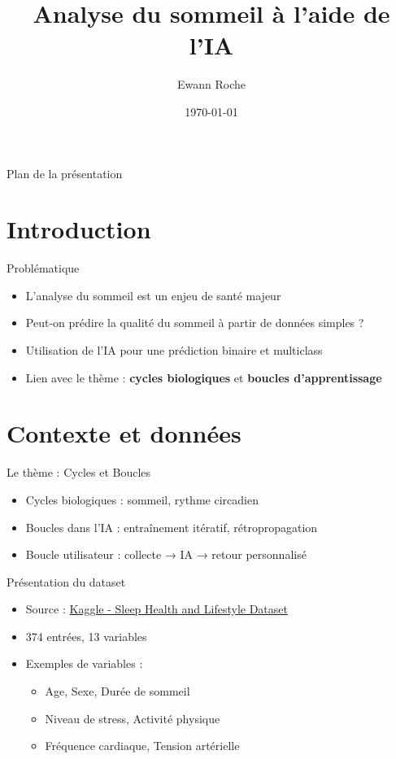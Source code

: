 \documentclass{beamer}
\title[TIPE - Cycles et Boucles]{Analyse du sommeil à l'aide de l'IA}
\author{Ewann Roche}
\date{\today}
\begin{document}
\begin{frame}
  \titlepage
\end{frame}

\begin{frame}{Plan de la présentation}
  \tableofcontents
\end{frame}

\section{Introduction}

\begin{frame}{Problématique}
  \begin{itemize}
    \item L'analyse du sommeil est un enjeu de santé majeur
    \item Peut-on prédire la qualité du sommeil à partir de données simples ?
    \item Utilisation de l'IA pour une prédiction binaire et multiclass
    \item Lien avec le thème : \textbf{cycles biologiques} et \textbf{boucles d'apprentissage}
  \end{itemize}
\end{frame}

\section{Contexte et données}

\begin{frame}{Le thème : Cycles et Boucles}
  \begin{itemize}
    \item Cycles biologiques : sommeil, rythme circadien
    \item Boucles dans l'IA : entraînement itératif, rétropropagation
    \item Boucle utilisateur : collecte → IA → retour personnalisé
  \end{itemize}
\end{frame}

\begin{frame}{Présentation du dataset}
  \begin{itemize}
    \item Source : \href{https://www.kaggle.com/datasets/uom190346a/sleep-health-and-lifestyle-dataset}{Kaggle - Sleep Health and Lifestyle Dataset}
    \item 374 entrées, 13 variables
    \item Exemples de variables :
    \begin{itemize}
      \item Age, Sexe, Durée de sommeil
      \item Niveau de stress, Activité physique
      \item Fréquence cardiaque, Tension artérielle
    \end{itemize}
  \end{itemize}
\end{frame}
\end{document}
